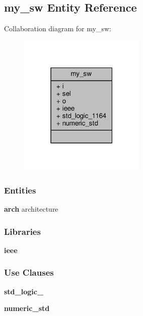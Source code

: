 \subsection{my\+\_\+sw Entity Reference}
\label{classmy__sw}


Collaboration diagram for my\+\_\+sw\+:\nopagebreak
\begin{figure}[H]
\begin{center}
\leavevmode
\includegraphics[width=171pt]{dd/de3/classmy__sw__coll__graph}
\end{center}
\end{figure}
\subsubsection*{Entities}
\begin{DoxyCompactItemize}
\item 
{\bf arch} architecture
\end{DoxyCompactItemize}
\subsubsection*{Libraries}
 \begin{DoxyCompactItemize}
\item 
{\bf ieee} 
\end{DoxyCompactItemize}
\subsubsection*{Use Clauses}
 \begin{DoxyCompactItemize}
\item 
{\bf std\+\_\+logic\+\_}   
\item 
{\bf numeric\+\_\+std}   
\end{DoxyCompactItemize}

